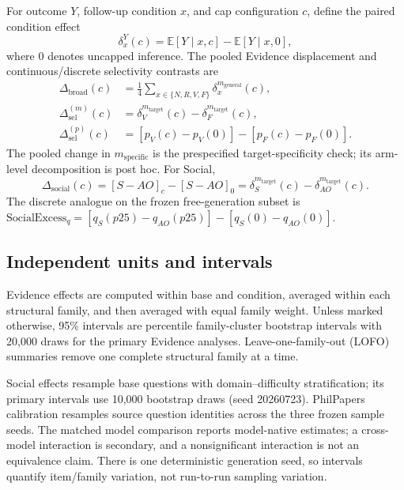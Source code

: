 \documentclass[letterpaper]{article}
\begin{document}
For outcome $Y$, follow-up condition $x$, and cap configuration $c$, define the paired condition effect
\begin{equation}
\delta_x^Y(c)=\mathbb{E}[Y\mid x,c]-\mathbb{E}[Y\mid x,0],
\end{equation}
where $0$ denotes uncapped inference.  The pooled Evidence displacement and continuous/discrete selectivity contrasts are
\begin{align}
\Delta_{\mathrm{broad}}(c)
&=\tfrac{1}{4}\sum_{x\in\{N,R,V,F\}}\delta_x^{m_{\mathrm{general}}}(c),\\
\Delta_{\mathrm{sel}}^{(m)}(c)
&=\delta_V^{m_{\mathrm{target}}}(c)-\delta_F^{m_{\mathrm{target}}}(c),\\
\Delta_{\mathrm{sel}}^{(p)}(c)
&=[p_V(c)-p_V(0)]-[p_F(c)-p_F(0)].
\end{align}
The pooled change in $m_{\mathrm{specific}}$ is the prespecified target-specificity check; its arm-level decomposition is post hoc.  For Social,
\begin{equation}
\Delta_{\mathrm{social}}(c)
=[S-AO]_c-[S-AO]_0
=\delta_S^{m_{\mathrm{target}}}(c)-\delta_{AO}^{m_{\mathrm{target}}}(c).
\end{equation}
The discrete analogue on the frozen free-generation subset is
$\mathrm{SocialExcess}_q=[q_S(p25)-q_{AO}(p25)]-[q_S(0)-q_{AO}(0)]$.

\subsection{Independent units and intervals}

Evidence effects are computed within base and condition, averaged within each structural family, and then averaged with equal family weight.  Unless marked otherwise, 95\% intervals are percentile family-cluster bootstrap intervals with 20,000 draws for the primary Evidence analyses.  Leave-one-family-out (LOFO) summaries remove one complete structural family at a time.

Social effects resample base questions with domain--difficulty stratification; its primary intervals use 10,000 bootstrap draws (seed 20260723).  PhilPapers calibration resamples source question identities across the three frozen sample seeds.  The matched model comparison reports model-native estimates; a cross-model interaction is secondary, and a nonsignificant interaction is not an equivalence claim.  There is one deterministic generation seed, so intervals quantify item/family variation, not run-to-run sampling variation.
\end{document}
